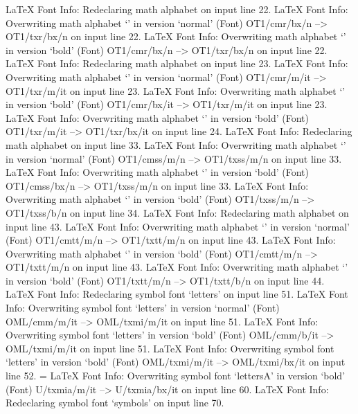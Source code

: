 LaTeX Font Info:    Redeclaring math alphabet \mathbf on input line 22.
LaTeX Font Info:    Overwriting math alphabet `\mathbf' in version `normal'
(Font)                  OT1/cmr/bx/n --> OT1/txr/bx/n on input line 22.
LaTeX Font Info:    Overwriting math alphabet `\mathbf' in version `bold'
(Font)                  OT1/cmr/bx/n --> OT1/txr/bx/n on input line 22.
LaTeX Font Info:    Redeclaring math alphabet \mathit on input line 23.
LaTeX Font Info:    Overwriting math alphabet `\mathit' in version `normal'
(Font)                  OT1/cmr/m/it --> OT1/txr/m/it on input line 23.
LaTeX Font Info:    Overwriting math alphabet `\mathit' in version `bold'
(Font)                  OT1/cmr/bx/it --> OT1/txr/m/it on input line 23.
LaTeX Font Info:    Overwriting math alphabet `\mathit' in version `bold'
(Font)                  OT1/txr/m/it --> OT1/txr/bx/it on input line 24.
LaTeX Font Info:    Redeclaring math alphabet \mathsf on input line 33.
LaTeX Font Info:    Overwriting math alphabet `\mathsf' in version `normal'
(Font)                  OT1/cmss/m/n --> OT1/txss/m/n on input line 33.
LaTeX Font Info:    Overwriting math alphabet `\mathsf' in version `bold'
(Font)                  OT1/cmss/bx/n --> OT1/txss/m/n on input line 33.
LaTeX Font Info:    Overwriting math alphabet `\mathsf' in version `bold'
(Font)                  OT1/txss/m/n --> OT1/txss/b/n on input line 34.
LaTeX Font Info:    Redeclaring math alphabet \mathtt on input line 43.
LaTeX Font Info:    Overwriting math alphabet `\mathtt' in version `normal'
(Font)                  OT1/cmtt/m/n --> OT1/txtt/m/n on input line 43.
LaTeX Font Info:    Overwriting math alphabet `\mathtt' in version `bold'
(Font)                  OT1/cmtt/m/n --> OT1/txtt/m/n on input line 43.
LaTeX Font Info:    Overwriting math alphabet `\mathtt' in version `bold'
(Font)                  OT1/txtt/m/n --> OT1/txtt/b/n on input line 44.
LaTeX Font Info:    Redeclaring symbol font `letters' on input line 51.
LaTeX Font Info:    Overwriting symbol font `letters' in version `normal'
(Font)                  OML/cmm/m/it --> OML/txmi/m/it on input line 51.
LaTeX Font Info:    Overwriting symbol font `letters' in version `bold'
(Font)                  OML/cmm/b/it --> OML/txmi/m/it on input line 51.
LaTeX Font Info:    Overwriting symbol font `letters' in version `bold'
(Font)                  OML/txmi/m/it --> OML/txmi/bx/it on input line 52.
\symlettersA=
LaTeX Font Info:    Overwriting symbol font `lettersA' in version `bold'
(Font)                  U/txmia/m/it --> U/txmia/bx/it on input line 60.
LaTeX Font Info:    Redeclaring symbol font `symbols' on input line 70.
